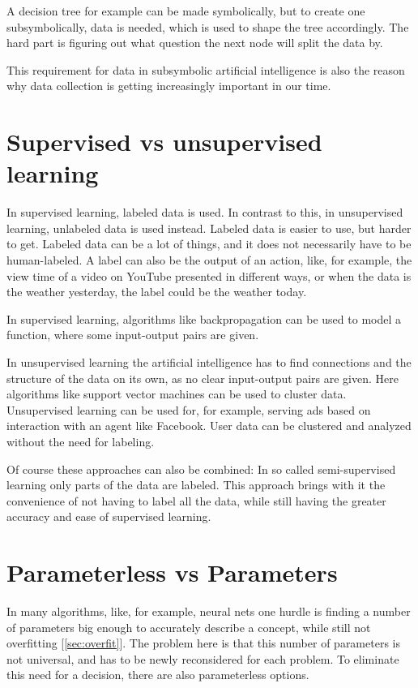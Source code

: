 A decision tree for example can be made symbolically, but to create one subsymbolically, data is needed, which is used to shape the tree accordingly.
The hard part is figuring out what question the next node will split the data by. 

This requirement for data in subsymbolic artificial intelligence is also the reason why data collection is getting increasingly important in our time. 

\section{Supervised vs unsupervised learning} \cite[p695]{MA}
In supervised learning, labeled data is used. In contrast to this, in unsupervised learning,  unlabeled data is used instead. 
Labeled data is easier to use, but harder to get. Labeled data can be a lot of things, and it does not necessarily have to be human-labeled. A label can also be the output of an action, like, for example, the view time of a video on YouTube presented in different ways, or when the data is the weather yesterday, the label could be the weather today.

In supervised learning, algorithms like backpropagation can be used to model a function, where some input-output pairs are given.

In unsupervised learning the artificial intelligence has to find connections and the structure of the data on its own, as no clear input-output pairs are given.
Here algorithms like support vector machines can be used to cluster data. Unsupervised learning can be used for, for example, serving ads based on interaction with an agent like Facebook. User data can be clustered and analyzed without the need for labeling.

Of course these approaches can also be combined: In so called semi-supervised learning only parts of the data are labeled. This approach brings with it the convenience of not having to label all the data, while still having the greater accuracy and ease of supervised learning. \cite{semisupervised}

\section{Parameterless vs Parameters} \cite[p737]{MA}
In many algorithms, like, for example, neural nets one hurdle is finding a number of parameters big enough to accurately describe a concept, while still not  overfitting [\autoref{sec:overfit}]. The problem here is that this number of parameters is not universal, and has to be newly reconsidered for each problem. To eliminate this need for a decision, there are also parameterless options. 

